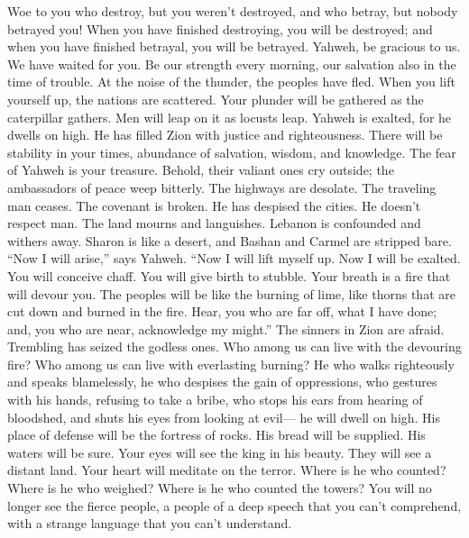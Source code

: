  Woe to you who destroy, but you weren't destroyed, and who
betray, but nobody betrayed you! When you have finished destroying, you
will be destroyed; and when you have finished betrayal, you will be
betrayed.  Yahweh, be gracious to us. We have waited for
you. Be our strength every morning, our salvation also in the time of
trouble.  At the noise of the thunder, the peoples have
fled. When you lift yourself up, the nations are scattered. 
Your plunder will be gathered as the caterpillar gathers. Men will leap
on it as locusts leap.  Yahweh is exalted, for he dwells on
high. He has filled Zion with justice and righteousness. 
There will be stability in your times, abundance of salvation, wisdom,
and knowledge. The fear of Yahweh is your treasure.  Behold,
their valiant ones cry outside; the ambassadors of peace weep bitterly.
 The highways are desolate. The traveling man ceases. The
covenant is broken. He has despised the cities. He doesn't respect man.
 The land mourns and languishes. Lebanon is confounded and
withers away. Sharon is like a desert, and Bashan and Carmel are
stripped bare.  ``Now I will arise,'' says Yahweh. ``Now I
will lift myself up. Now I will be exalted.  You will
conceive chaff. You will give birth to stubble. Your breath is a fire
that will devour you.  The peoples will be like the burning
of lime, like thorns that are cut down and burned in the fire.
 Hear, you who are far off, what I have done; and, you who
are near, acknowledge my might.''  The sinners in Zion are
afraid. Trembling has seized the godless ones. Who among us can live
with the devouring fire? Who among us can live with everlasting burning?
 He who walks righteously and speaks blamelessly, he who
despises the gain of oppressions, who gestures with his hands, refusing
to take a bribe, who stops his ears from hearing of bloodshed, and shuts
his eyes from looking at evil---  he will dwell on high.
His place of defense will be the fortress of rocks. His bread will be
supplied. His waters will be sure.  Your eyes will see the
king in his beauty. They will see a distant land.  Your
heart will meditate on the terror. Where is he who counted? Where is he
who weighed? Where is he who counted the towers?  You will
no longer see the fierce people, a people of a deep speech that you
can't comprehend, with a strange language that you can't understand.
